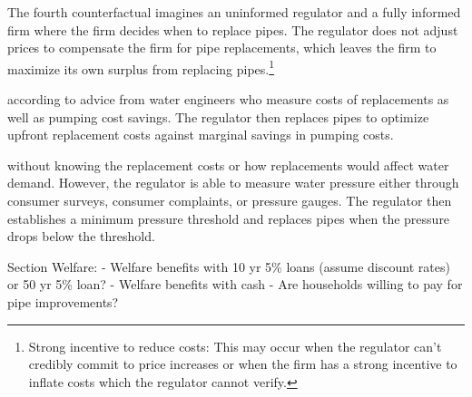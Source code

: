 \documentclass[12pt,table]{article}
\begin{document}







The fourth counterfactual imagines an uninformed regulator and a fully informed firm where the firm decides when to replace pipes.  The regulator does not adjust prices to compensate the firm for pipe replacements, which leaves the firm to maximize its own surplus from replacing pipes.\footnote{Strong incentive to reduce costs: This may occur when the regulator can't credibly commit to price increases or when the firm has a strong incentive to inflate costs which the regulator cannot verify.}




according to advice from water engineers who measure costs of replacements as well as pumping cost savings.  The regulator then replaces pipes to optimize upfront replacement costs against marginal savings in pumping costs.

without knowing the replacement costs or how replacements would affect water demand.  However, the regulator is able to measure water pressure either through consumer surveys, consumer complaints, or pressure gauges.  The regulator then establishes a minimum pressure threshold and replaces pipes when the pressure drops below the threshold.


Section Welfare:
	- Welfare benefits with 10 yr 5\% loans (assume discount rates) or 50 yr 5\% loan?
	- Welfare benefits with cash
	- Are households willing to pay for pipe improvements?
\end{document}
